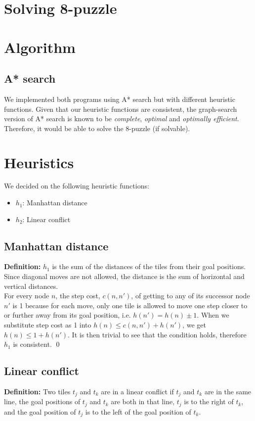 \documentclass[11pt, a4paper]{article}
\begin{document}
\section*{Solving 8-puzzle}
\section{Algorithm}
\subsection{A* search}
We implemented both programs using A* search but with different heuristic functions. Given that our heuristic functions are consistent, the graph-search version of A* search is known to be \textit{complete}, \textit{optimal} and \textit{optimally efficient}. Therefore, it would be able to solve the 8-puzzle (if solvable).

\section{Heuristics}
We decided on the following heuristic functions:
\begin{itemize}
	\item $h_1$: Manhattan distance
	\item $h_2$: Linear conflict
\end{itemize}

\subsection{Manhattan distance}
\textbf{Definition:} $h_1$ is the sum of the distances of the tiles from their goal positions. Since diagonal moves are not allowed, the distance is the sum of horizontal and vertical distances. \\

For every node $n$, the step cost, $c(n, n')$, of getting to any of its successor node $n'$ is 1 because for each move, only one tile is allowed to move one step closer to or further away from its goal position, i.e. $h(n') = h(n) \pm 1$. When we substitute step cost as 1 into $h(n) \leq c(n, n') + h(n')$, we get $h(n) \leq 1 + h(n')$. It is then trivial to see that the condition holds, therefore $h_1$ is consistent. \qed

\subsection{Linear conflict}
\textbf{Definition:} Two tiles $t_j$ and $t_k$ are in a linear conflict if $t_j$ and $t_k$ are in the same line, the goal positions of $t_j$ and $t_k$ are both in that line, $t_j$ is to the right of $t_k$, and the goal position of $t_j$ is to the left of the goal position of $t_k$.\\
\end{document}
